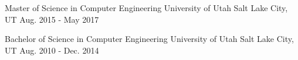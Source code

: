 


\begin{cventries}


\cventry
{Master of Science in Computer Engineering}
{University of Utah}
{Salt Lake City, UT}
{Aug. 2015 - May 2017}
{}


\cventry
{Bachelor of Science in Computer Engineering}
{University of Utah}
{Salt Lake City, UT}
{Aug. 2010 - Dec. 2014}
{}


\end{cventries}
